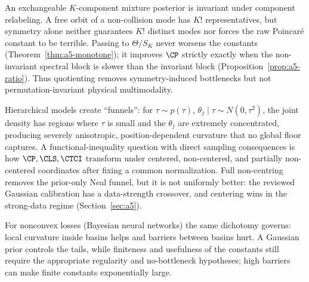 \documentclass[../main.tex]{subfiles}
\begin{document}
\begin{remark}
\label{rem:label-switching}
An exchangeable $K$-component mixture posterior is invariant under component relabeling. A free
orbit of a non-collision mode has $K!$ representatives, but symmetry alone neither guarantees
$K!$ distinct modes nor forces the raw Poincar\'e constant to be terrible. Passing to
$\Theta/S_K$ never worsens the constants (Theorem~\ref{thm:a5-monotone}); it improves $\CP$
strictly exactly when the non-invariant spectral block is slower than the invariant block
(Proposition~\ref{prop:a5-ratio}). Thus quotienting removes symmetry-induced bottlenecks but not
permutation-invariant physical multimodality.
\end{remark}

\begin{remark}
\label{rem:funnel}
Hierarchical models create ``funnels'': for $\tau\sim p(\tau)$, $\theta_j\mid\tau\sim N(0,\tau^2)$,
the joint density has regions where $\tau$ is small and the $\theta_j$ are extremely
concentrated, producing severely anisotropic, position-dependent curvature that no global floor
captures. A functional-inequality question with direct sampling consequences is how
$\CP,\CLS,\CTCI$ transform under centered, non-centered, and partially non-centered coordinates
after fixing a common normalization. Full non-centring removes the prior-only Neal funnel, but it
is not uniformly better: the reviewed Gaussian calibration has a data-strength crossover, and
centering wins in the strong-data regime (Section~\ref{sec:a5}).
\end{remark}

\noindent For nonconvex losses (Bayesian neural networks) the same dichotomy governs:
local curvature inside basins helps and barriers between basins hurt. A Gaussian prior controls
the tails, while finiteness and usefulness of the constants still require the appropriate
regularity and no-bottleneck hypotheses; high barriers can make finite constants exponentially
large.
\end{document}
